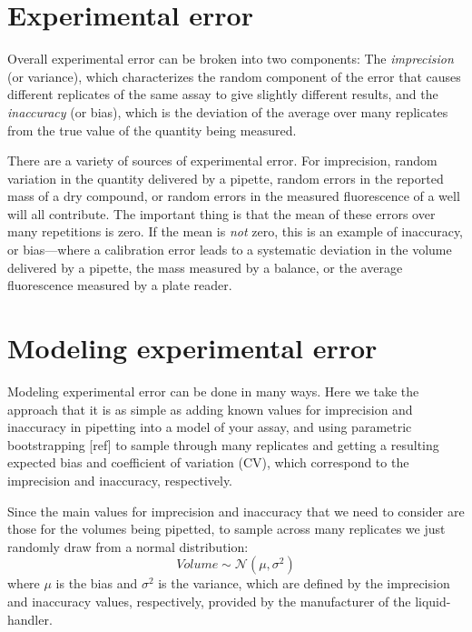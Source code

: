 \documentclass[aps,pre,twocolumn,nofootinbib,superscriptaddress,linenumbers]{revtex4-1}
\begin{document}
\section{Experimental error}

Overall experimental error can be broken into two components: The \emph{imprecision} (or variance), which characterizes the random component of the error that causes different replicates of the same assay to give slightly different results, and the \emph{inaccuracy} (or bias), which is the deviation of the average over many replicates from the true value of the quantity being measured.

There are a variety of sources of experimental error. 
For imprecision, random variation in the quantity delivered by a pipette, random errors in the reported mass of a dry compound, or random errors in the measured fluorescence of a well will all contribute. 
The important thing is that the mean of these errors over many repetitions is zero. 
If the mean is \emph{not} zero, this is an example of inaccuracy, or bias---where a calibration error leads to a systematic deviation in the volume delivered by a pipette, the mass measured by a balance, or the average fluorescence measured by a plate reader.

\section*{Modeling experimental error}

Modeling experimental error can be done in many ways. 
Here we take the approach that it is as simple as adding known values for imprecision and inaccuracy in pipetting into a model of your assay, and using parametric bootstrapping [ref] to sample through many replicates and getting a resulting expected bias and coefficient of variation (CV), which correspond to the imprecision and inaccuracy, respectively. 

Since the main values for imprecision and inaccuracy that we need to consider are those for the volumes being pipetted, to sample across many replicates we just randomly draw from a normal distribution:
\begin{equation} \label{eq:1}
Volume \sim \mathcal{N}(\mu,\sigma^2) 
\end{equation}
where $\mu$ is the bias and $\sigma^2$ is the variance, which are defined by the imprecision and inaccuracy values, respectively, provided by the manufacturer of the liquid-handler.
\end{document}
